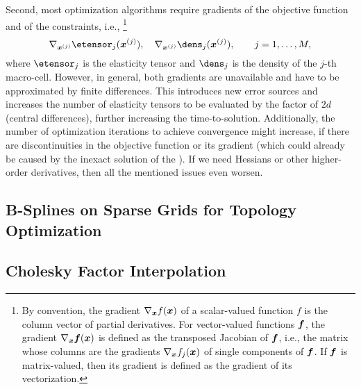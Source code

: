 Second, most optimization algorithms require gradients of the
objective function and of the constraints, i.e.,%
\footnote{%
  By convention, the gradient $\nabla_{{\boldsymbol{x}}} f({\boldsymbol{x}})$ of a
  scalar-valued function $f$ is the column vector of partial derivatives.
  For vector-valued functions ${\boldsymbol{f}}$, the gradient $\nabla_{{\boldsymbol{x}}} {\boldsymbol{f}}({\boldsymbol{x}})$
  is defined as the transposed Jacobian of ${\boldsymbol{f}}$, i.e.,
  the matrix whose columns are the gradients $\nabla_{{\boldsymbol{x}}} f_j({\boldsymbol{x}})$ of
  single components of ${\boldsymbol{f}}$.
  If ${\boldsymbol{f}}$ is matrix-valued, then its gradient is defined as the
  gradient of its vectorization.%
}
\begin{equation}
\nabla_{\*x^{(j)}} \etensor_j(\*x^{(j)}),\quad
\nabla_{\*x^{(j)}} \dens_j(\*x^{(j)}),\qquad
j = 1, \dotsc, M,
\end{equation}
where $\etensor_j$ is the elasticity tensor and
$\dens_j$ is the density of the $j$-th macro-cell.
However, in general, both gradients are unavailable and
have to be approximated by finite differences.
This introduces new error sources and
increases the number of elasticity tensors to be evaluated
by the factor of $2d$ (central differences),
further increasing the time-to-solution.
Additionally, the number of optimization iterations to
achieve convergence might increase,
if there are discontinuities in the objective function
or its gradient
(which could already be caused by the inexact solution of the \fem).
If we need Hessians or other higher-order derivatives,
then all the mentioned issues even worsen.



\subsection{B-Splines on Sparse Grids for Topology Optimization}
\label{sec:622BSplines}

\blindtext{}



\subsection{Cholesky Factor Interpolation}
\label{sec:623cholesky}

\blindtext{}















































